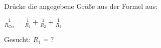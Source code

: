 
Drücke die angegebene Größe aus der Formel aus:

$\frac{1}{R_{Ges}}=\frac{1}{R_{1}}+\frac{1}{R_{2}}+\frac{1}{R_{3}}$

Gesucht: $R_{1}=\text{?}$